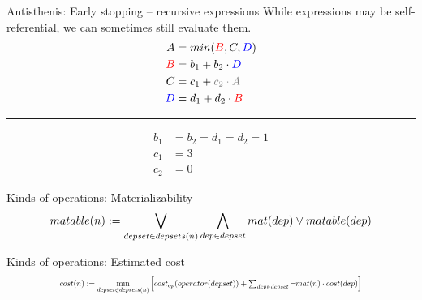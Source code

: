 \begin{frame}{Antisthenis: Early stopping -- recursive expressions}
  {While expressions may be self-referential, we can
    sometimes still evaluate them.}
  \begin{align*}
    A &= min({\color{red}B}, C, {\color{blue}D}) \\
    {\color{red}B} &= b_1 + b_2 \cdot {\color{blue}D} \\
    C &= c_1 + {\color{gray}c_2 \cdot A} \\
    {\color{blue}D} &= d_1 + d_2 \cdot {\color{red}B} \\
  \end{align*}
  \hrule
  \begin{align*}
    b_1 &= b_2 = d_1 = d_2 = 1 \\
    c_1 &= 3 \\
    c_2 &= 0
  \end{align*}
\end{frame}

\newcommand{\wlor}{\mathop{\bigvee}\displaylimits}
\newcommand{\wland}{\mathop{\bigwedge}\displaylimits}
\begin{frame}{Kinds of operations: Materializability}
  \[
    matable(n) := \wlor_{depset \in depsets(n)}\wland_{dep \in depset} mat(dep) \lor matable(dep)
  \]
\end{frame}

\begin{frame}{Kinds of operations: Estimated cost}
    \[
  \scalebox{0.7}{
    \(cost(n) := \min\limits_{depset \in depsets(n)}\left[cost_{op}(operator(depset)) + \sum_{dep \in depset}\neg mat(n) \cdot cost(dep)\right]\)
    }
    \]
\end{frame}
